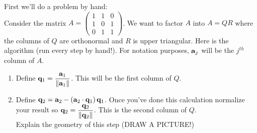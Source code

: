 \begin{problem}
    First we'll do a problem by hand: \\
    Consider the matrix $A = \begin{pmatrix} 1 & 1 & 0 \\ 1 & 0 & 1 \\ 0 & 1 & 1
    \end{pmatrix}$.  We want to factor $A$ into $A = QR$ where the columns of $Q$ are
    orthonormal and $R$ is upper triangular.  Here is the algorithm (run every step by
    hand!).  For notation purposes, ${\bf a}_j$ will be the $j^{th}$ column of $A$.
    \begin{enumerate}
        \item Define ${\bf q}_1 = \displaystyle \frac{{\bf a}_1}{\|{\bf a}_1\|}$.  This will be the
            first column of $Q$.\\
        \item Define ${\bf q}_2 = \displaystyle {\bf a}_2 - \left( {\bf a}_2 \cdot {\bf q}_1 \right)
            {\bf q}_1$.  Once you've done this calculation normalize your result so
            $\displaystyle {\bf q}_2 = \frac{{\bf q}_2}{\|{\bf q}_2\|}$. This is the second column
            of $Q$.  \\Explain the geometry of this step (DRAW A PICTURE!)\\

\end{enumerate}
\end{problem}
